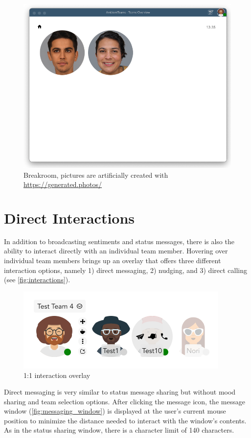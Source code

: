 \begin{figure}[h]
    \centering
    \includegraphics[width=.8\linewidth]{./images/breakroom.png}
    \caption{Breakroom, pictures are artificially created with \url{https://generated.photos/}}
    \label{fig:breakroom}
\end{figure}

\section{Direct Interactions}
In addition to broadcasting sentiments and status messages, there is also the ability to interact directly with an individual team member. Hovering over individual team members brings up an overlay that offers three different interaction options, namely 1) direct messaging, 2) nudging, and 3) direct calling (see \autoref{fig:interactions}).

\begin{figure}[h]
    \centering
    \includegraphics[width=.4\linewidth]{./images/interactions.png}
    \caption{1:1 interaction overlay }
    \label{fig:interactions}
\end{figure}

Direct messaging is very similar to status message sharing but without mood sharing and team selection options. After clicking the message icon, the message window (\autoref{fig:messaging_window}) is displayed at the user's current mouse position to minimize the distance needed to interact with the window's contents. As in the status sharing window, there is a character limit of 140 characters.

